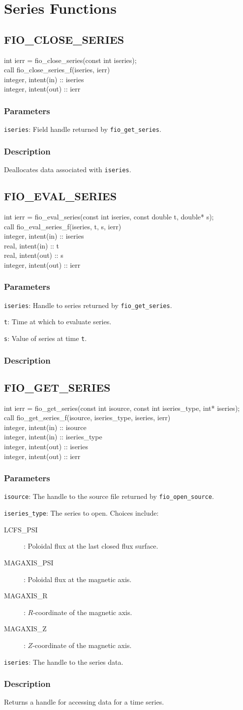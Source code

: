 \documentclass{article}
\newcommand{\parameter}[2]{\noindent \texttt{#1}: #2}
\newcommand{\function}[4]{
  \subsection{\uppercase{#1}}

  #2

  \subsubsection{Parameters}
  #3

  \subsubsection{Description}
  #4
}
\begin{document}
\section{Series Functions}

\function{fio\_close\_series}
{
\noindent
int ierr = fio\_close\_series(const int iseries);\\

\noindent
call fio\_close\_series\_f(iseries, ierr)\\
integer, intent(in) :: iseries\\
integer, intent(out) :: ierr
}
{
  \parameter{iseries}{Field handle returned by \texttt{fio\_get\_series}.}
}
{
  Deallocates data associated with \texttt{iseries}.
}

\function{fio\_eval\_series}
{
  \noindent
  int ierr = fio\_eval\_series(const int iseries, const double t,
  double* s);\\

  \noindent
  call fio\_eval\_series\_f(iseries, t, s, ierr)\\
  integer, intent(in) :: iseries\\
  real, intent(in) :: t\\
  real, intent(out) :: s\\
  integer, intent(out) :: ierr
}
{
  \parameter{iseries}{Handle to series returned by
    \texttt{fio\_get\_series}.}

  \parameter{t}{Time at which to evaluate series.}

  \parameter{s}{Value of series at time \texttt{t}.}
}

\function{fio\_get\_series}
{
\noindent
int ierr = fio\_get\_series(const int isource, const int
iseries\_type, int* iseries);\\

\noindent
call fio\_get\_series\_f(isource, iseries\_type, iseries, ierr)\\
integer, intent(in) :: isource\\
integer, intent(in) :: iseries\_type\\
integer, intent(out) :: iseries\\
integer, intent(out) :: ierr
}
{
\parameter{isource}{The handle to the source file returned by
  \texttt{fio\_open\_source}.}

\parameter{iseries\_type}{The series to open.  Choices include:
\begin{description}
\item[LCFS\_PSI]: Poloidal flux at the last closed flux surface.
\item[MAGAXIS\_PSI]: Poloidal flux at the magnetic axis.
\item[MAGAXIS\_R]: $R$-coordinate of the magnetic axis.
\item[MAGAXIS\_Z]: $Z$-coordinate of the magnetic axis.
\end{description}}

\parameter{iseries}{The handle to the series data.}
}
{
  Returns a handle for accessing data for a time series.
}
\end{document}
